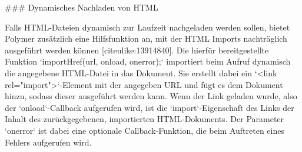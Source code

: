 ### Dynamisches Nachladen von HTML

Falls HTML-Dateien dynamisch zur Laufzeit nachgeladen werden sollen, bietet Polymer zusätzlich eine Hilfsfunktion an, mit der HTML Imports nachträglich ausgeführt werden können [citeulike:13914840]. Die hierfür bereitgestellte Funktion `importHref(url, onload, onerror);` importiert beim Aufruf dynamisch die angegebene HTML-Datei in das Dokument. Sie erstellt dabei ein `<link rel="import">`-Element mit der angegeben URL und fügt es dem Dokument hinzu, sodass dieser ausgeführt werden kann. Wenn der Link geladen wurde, also der `onload`-Callback aufgerufen wird, ist die `import`-Eigenschaft des Links der Inhalt des zurückgegebenen, importierten HTML-Dokuments. Der Parameter `onerror` ist dabei eine optionale Callback-Funktion, die beim Auftreten eines Fehlers aufgerufen wird.

\fi

